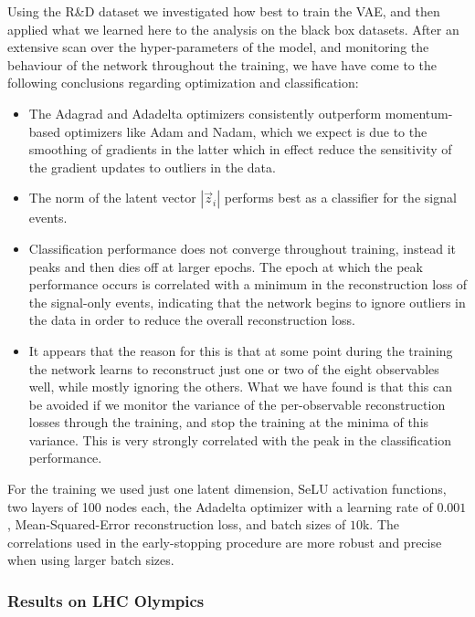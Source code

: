\documentclass[a4paper,11pt]{article}
\begin{document}
\noindent Using the R\&D dataset we investigated how best to train the VAE, and then applied what we learned here to the analysis on the black box datasets.
After an extensive scan over the hyper-parameters of the model, and monitoring the behaviour of the network throughout the training, we have have come to the following conclusions regarding optimization and classification:
\begin{itemize}
    \item The Adagrad and Adadelta optimizers consistently outperform momentum-based optimizers like Adam and Nadam, which we expect is due to the smoothing of gradients in the latter which in effect reduce the sensitivity of the gradient updates to outliers in the data.
    \item The norm of the latent vector $|\vec{z}_i|$ performs best as a classifier for the signal events.
    \item Classification performance does not converge throughout training, instead it peaks and then dies off at larger epochs.
        The epoch at which the peak performance occurs is correlated with a minimum in the reconstruction loss of the signal-only events, indicating that the network begins to ignore outliers in the data in order to reduce the overall reconstruction loss.
    \item It appears that the reason for this is that at some point during the training the network learns to reconstruct just one or two of the eight observables well, while mostly ignoring the others.  What we have found is that this can be avoided if we monitor the variance of the per-observable reconstruction losses through the training, and stop the training at the minima of this variance.  This is very strongly correlated with the peak in the classification performance.
\end{itemize}
For the training we used just one latent dimension, SeLU activation functions, two layers of 100 nodes each, the Adadelta optimizer with a learning rate of $0.001$, Mean-Squared-Error reconstruction loss, and batch sizes of $10$k.
The correlations used in the early-stopping procedure are more robust and precise when using larger batch sizes.

\subsubsection{Results on LHC Olympics}
\label{sec:results}
\end{document}

